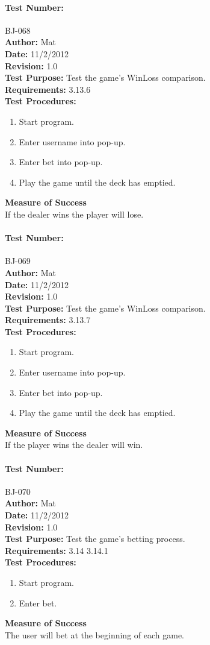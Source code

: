 \documentclass{article}
\begin{document}
\paragraph{Test Number:} BJ-068\\
\textbf{Author:} Mat\\
\textbf{Date:} 11/2/2012\\
\textbf{Revision:} 1.0\\
\textbf{Test Purpose:} Test the game's WinLoss comparison.\\
\textbf{Requirements:} 3.13.6 \\
\textbf{Test Procedures:} 
\begin{enumerate}
\item Start program.
\item Enter username into pop-up.
\item Enter bet into pop-up.
\item Play the game until the deck has emptied.
\end{enumerate}
\textbf{Measure of Success}\\If the dealer wins the player will lose.
\paragraph{Test Number:} BJ-069\\
\textbf{Author:} Mat\\
\textbf{Date:} 11/2/2012\\
\textbf{Revision:} 1.0\\
\textbf{Test Purpose:} Test the game's WinLoss comparison.\\
\textbf{Requirements:} 3.13.7 \\
\textbf{Test Procedures:} 
\begin{enumerate}
\item Start program.
\item Enter username into pop-up.
\item Enter bet into pop-up.
\item Play the game until the deck has emptied.
\end{enumerate}
\textbf{Measure of Success}\\If the player wins the dealer will win.
\paragraph{Test Number:} BJ-070\\
\textbf{Author:} Mat\\
\textbf{Date:} 11/2/2012\\
\textbf{Revision:} 1.0\\
\textbf{Test Purpose:} Test the game's betting process.\\
\textbf{Requirements:} 3.14 3.14.1 \\
\textbf{Test Procedures:} 
\begin{enumerate}
\item Start program.
\item Enter bet.
\end{enumerate}
\textbf{Measure of Success}\\The user will bet at the beginning of each game.
\end{document}
